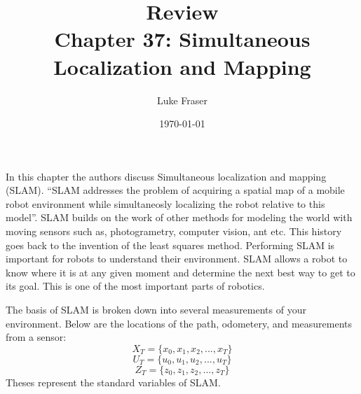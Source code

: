 \documentclass{article}
\begin{document}
\title{{\large Review} \\ Chapter 37: Simultaneous Localization and Mapping}
\author{Luke Fraser}
\date{\today}
\maketitle

\begingroup
\renewcommand{\section}[2]{}


\endgroup

\section*{Summary}
In this chapter the authors discuss Simultaneous localization and mapping (SLAM). ``SLAM addresses the problem of acquiring a spatial map of a mobile robot environment while simultaneosly localizing the robot relative to this model''\cite{slam}. SLAM builds on the work of other methods for modeling the world with moving sensors such as, photogrametry, computer vision, ant etc. This history goes back to the invention of the least squares method. Performing SLAM is important for robots to understand their environment. SLAM allows a robot to know where it is at any given moment and determine the next best way to get to its goal. This is one of the most important parts of robotics.

The basis of SLAM is broken down into several measurements of your environment. Below are the locations of the path, odometery, and measurements from a sensor: $$X_T = \{x_0, x_1, x_2, ...,x_T\}$$ $$U_T = \{u_0, u_1, u_2, ...,u_T\}$$ $$Z_T = \{z_0, z_1, z_2, ...,z_T\}$$ Theses represent the standard variables of SLAM.
\end{document}
